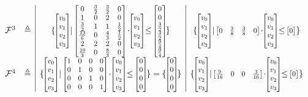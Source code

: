 \begin{example}
\begin{figure}[t]
\[\begin{array}{rc|c|c}
			\mathcal{F}^3 & \eqdef & \{\,\cvec{v_0}{v_1}{v_2}{v_3} \mid {\scalebox{\vecscale}{$ \!\begin{bmatrix} 0 & \frac{3}{2} & \frac{3}{2} & 0 \\ 1&0 &2 &0 \\ \frac{3}{2}&1&1&\frac{1}{2} \\ \frac{13}{6} & 0 & \frac{4}{3} & \frac{1}{2}
                \\ 2&2&2&0 \\ \frac{10}{3}&0&\frac{8}{3}&0\end{bmatrix}\!$}} \cdot \cvec{v_0}{v_1}{v_2}{v_3} \leq {\scalebox{\vecscale}{$ \!\begin{bmatrix}0 \\ 0 \\ \frac{3}{2} \\ \frac{3}{2} \\\frac{9}{4} \\ \frac{9}{4}  \end{bmatrix}\!$} } \}                                                                     & \{\,\cvec{v_0}{v_1}{v_2}{v_3} \mid {\scalebox{\vecscale}{$ \!\begin{bmatrix} 0 & \frac{3}{8} & \frac{3}{8} & 0 \end{bmatrix}\!$}} \cdot \cvec{v_0}{v_1}{v_2}{v_3} \leq {\scalebox{\vecscale}{$ \!\begin{bmatrix} 0  \end{bmatrix}\!$} } \,\} \\
			\mathcal{F}^4 & \eqdef & \{\,\cvec{v_0}{v_1}{v_2}{v_3} \mid  {\scalebox{\vecscale}{$ \!\begin{bmatrix} 1 & 0 & 0 & 0 \\ 0&1 &0 &0 \\ 0&0&1&0\\ 0&0&0&1\end{bmatrix}\!$}} \cdot \cvec{v_0}{v_1}{v_2}{v_3} \leq {\scalebox{\vecscale}{$ \!\begin{bmatrix}0 \\ 0 \\ 0\\0  \end{bmatrix}\!$} }    \}  = \{ \, \cvec{0}{0}{0}{0} \, \} & \{\,\cvec{v_0}{v_1}{v_2}{v_3} \mid {\scalebox{\vecscale}{$ \!\begin{bmatrix} \frac{9}{16} & 0 & 0 & \frac{3}{16} \end{bmatrix}\!$}} \cdot \cvec{v_0}{v_1}{v_2}{v_3} \leq {\scalebox{\vecscale}{$ \!\begin{bmatrix} 0  \end{bmatrix}\!$} } \,\}                                                            \\

\end{array}\]
\end{figure}
\end{example}

